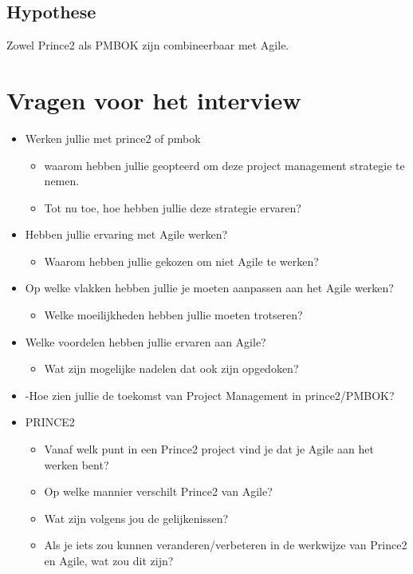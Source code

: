 \documentclass[]{article}
\begin{document}
\subsection{Hypothese}
Zowel Prince2 als PMBOK zijn combineerbaar met Agile.

\section{Vragen voor het interview}
\begin{itemize}
	\item Werken jullie met prince2 of pmbok
	\begin{itemize}
		\item waarom hebben jullie geopteerd om deze project management strategie te nemen.
		\item Tot nu toe, hoe hebben jullie deze strategie ervaren?
	\end{itemize}
		
	\item Hebben jullie ervaring met Agile werken?
	\begin{itemize}
		\item Waarom hebben jullie gekozen om niet Agile te werken?
	\end{itemize}
		
	\item Op welke vlakken hebben jullie je moeten aanpassen aan het Agile werken?
	\begin{itemize}
		\item Welke moeilijkheden hebben jullie moeten trotseren?
	\end{itemize}
		
	\item Welke voordelen hebben jullie ervaren aan Agile?
	\begin{itemize}
		\item Wat zijn mogelijke nadelen dat ook zijn opgedoken?
	\end{itemize}
		
	\item -Hoe zien jullie de toekomst van Project Management in prince2/PMBOK?
	
	\item PRINCE2
	\begin{itemize}
		\item Vanaf welk punt in een Prince2 project vind je dat je Agile aan het werken bent?
		\item Op welke mannier verschilt Prince2 van Agile?
		\item Wat zijn volgens jou de gelijkenissen?
		\item Als je iets zou kunnen veranderen/verbeteren in de werkwijze van Prince2 en Agile, wat zou dit zijn?
	\end{itemize}
		

\end{itemize}
\end{document}
